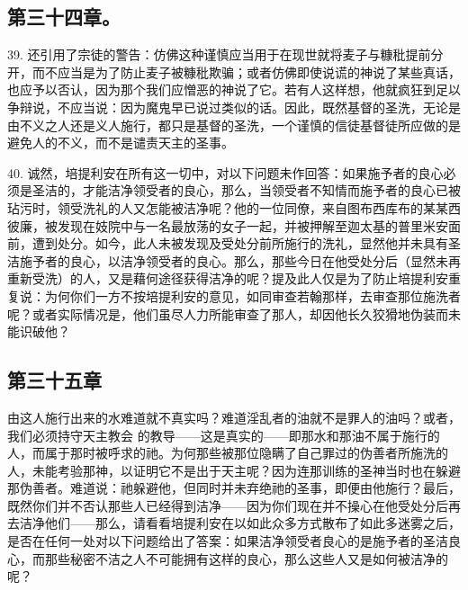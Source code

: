 
\subsection{第三十四章。}

39. 还引用了宗徒的警告：仿佛这种谨慎应当用于在现世就将麦子与糠秕提前分开，而不应当是为了防止麦子被糠秕欺骗；或者仿佛即使说谎的神说了某些真话，也应予以否认，因为那个我们应憎恶的神说了它。若有人这样想，他就疯狂到足以争辩说，不应当说：因为魔鬼早已说过类似的话。因此，既然基督的圣洗，无论是由不义之人还是义人施行，都只是基督的圣洗，一个谨慎的信徒基督徒所应做的是避免人的不义，而不是谴责天主的圣事。\par

40. 诚然，培提利安在所有这一切中，对以下问题未作回答：如果施予者的良心必须是圣洁的，才能洁净领受者的良心，那么，当领受者不知情而施予者的良心已被玷污时，领受洗礼的人又怎能被洁净呢？他的一位同僚，来自图布西库布的某某西彼廉，被发现在妓院中与一名最放荡的女子一起，并被押解至迦太基的普里米安面前，遭到处分。如今，此人未被发现及受处分前所施行的洗礼，显然他并未具有圣洁施予者的良心，以洁净领受者的良心。那么，那些今日在他受处分后（显然未再重新受洗）的人，又是藉何途径获得洁净的呢？提及此人仅是为了防止培提利安重复说：为何你们一方不按培提利安的意见，如同审查若翰那样，去审查那位施洗者呢？或者实际情况是，他们虽尽人力所能审查了那人，却因他长久狡猾地伪装而未能识破他？\par


\subsection{第三十五章}

由这人施行出来的水难道就不真实吗？难道淫乱者的油就不是罪人的油吗？或者，我们必须持守天主教会 的教导——这是真实的——即那水和那油不属于施行的人，而属于那时被呼求的祂。为何那些被那位隐瞒了自己罪过的伪善者所施洗的人，未能考验那神，以证明它不是出于天主呢？因为连那训练的圣神当时也在躲避那伪善者。难道说：祂躲避他，但同时并未弃绝祂的圣事，即便由他施行？最后，既然你们并不否认那些人已经得到洁净——因为你们现在并不操心在他受处分后再去洁净他们——那么，请看看培提利安在以如此众多方式散布了如此多迷雾之后，是否在任何一处对以下问题给出了答案：如果洁净领受者良心的是施予者的圣洁良心，而那些秘密不洁之人不可能拥有这样的良心，那么这些人又是如何被洁净的呢？\par

